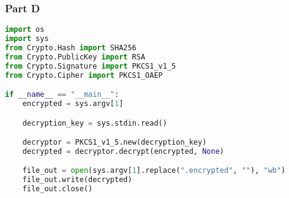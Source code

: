 \documentclass{article}
\begin{document}
\subsubsection*{Part D}

\begin{lstlisting}[language=Python]
import os
import sys
from Crypto.Hash import SHA256
from Crypto.PublicKey import RSA
from Crypto.Signature import PKCS1_v1_5
from Crypto.Cipher import PKCS1_OAEP

if __name__ == "__main__":
    encrypted = sys.argv[1]

    decryption_key = sys.stdin.read()

    decryptor = PKCS1_v1_5.new(decryption_key)
    decrypted = decryptor.decrypt(encrypted, None)

    file_out = open(sys.argv[1].replace(".encrypted", ""), "wb")
    file_out.write(decrypted)
    file_out.close()
\end{lstlisting}
\end{document}
